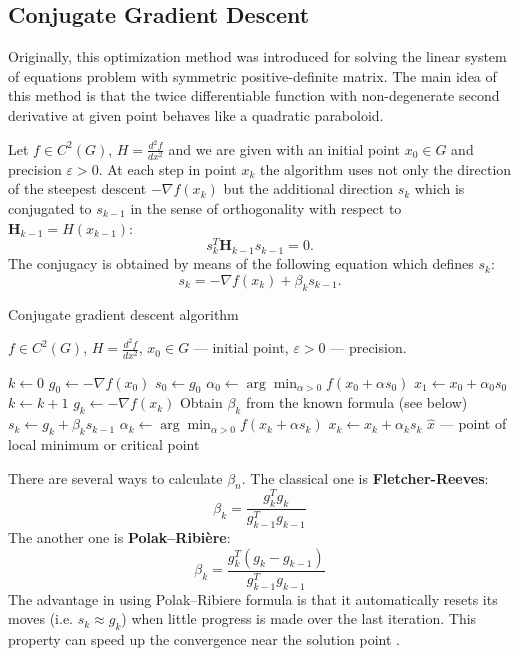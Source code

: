 \documentclass[12pt, bachelor, substylefile = algo_title.rtx]{disser}
\newcommand{\eps}{\varepsilon}
\theoremstyle{definition}
\begin{document}
\subsection{Conjugate Gradient Descent}
Originally, this optimization method was introduced for solving the linear system of equations problem with symmetric positive-definite matrix. The main idea of this method is that the twice differentiable function with non-degenerate second derivative at given point behaves like a quadratic paraboloid. 

Let $f \in C^2(G)$, $H = \frac{d^2 f}{dx^2}$ and we are given with an initial point $x_0 \in G$ and precision $\eps > 0$. At each step in point $x_k$ the algorithm uses not only the direction of the steepest descent $-\nabla f(x_k)$ but the additional direction $s_k$ which is conjugated to $s_{k-1}$ in the sense of orthogonality with respect to $\mathbf{H}_{k-1} = H(x_{k-1})$:
\[ s_k ^{T} \mathbf{H}_{k-1} s_{k-1} = 0. \]
The conjugacy is obtained by means of the following equation which defines $s_k$:
\[ s_k = -\nabla f(x_k) + \beta_k s_{k-1}. \]

\begin{algorithm}[h]
\caption{Conjugate gradient descent algorithm}
\label{alg: conjgrad}
\begin{algorithmic}

\Require $f \in C^2(G)$, $H = \frac{d^2 f}{dx^2}$, $x_0 \in G$ --- initial point, $\eps>0$ --- precision. 

\State $k \gets 0$
\State $g_0 \gets -\nabla f(x_0)$
\State $s_0 \gets g_0$
\State $\alpha_0 \gets \arg \min_{\alpha>0} f(x_0 + \alpha s_0)$
\State $x_1 \gets x_0 + \alpha_0 s_0$
\While{$\|x_k - x_{k-1}\| > \eps$}
\State $k \gets k+1$
\State $g_k \gets -\nabla f(x_k)$
\State Obtain $\beta_k$ from the known formula (see below)
\State $s_k \gets g_k + \beta_k s_{k-1}$
\State $\alpha_k \gets \arg \min_{\alpha>0} f(x_k + \alpha s_k)$
\State $x_k \gets x_k + \alpha_k s_k$
\EndWhile
\Ensure $\widehat{x}$ --- point of local minimum or critical point
\end{algorithmic}
\end{algorithm}


There are several ways to calculate $\beta_n$. The classical one is \textbf{Fletcher-Reeves}:
\[ \beta_k = \frac{g^T_k g_k}{g^T_{k-1} g_{k-1}} \]
The another one is \textbf{Polak–Ribière}:
\[ \beta_k = \frac{g^T_k (g_k - g_{k-1})}{g^T_{k-1} g_{k-1}} \]
The advantage in using Polak–Ribiere formula is that it automatically resets its moves (i.e. $s_k \approx g_k$) when little progress is made over the last iteration. This property can speed up the convergence near the solution point \cite{cavazzuti13}.
\end{document}
